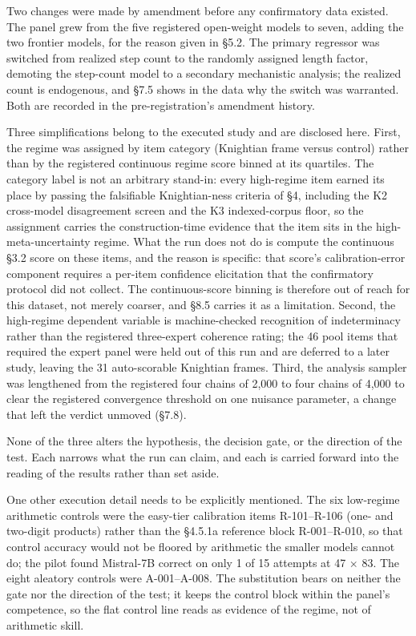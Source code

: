 \documentclass{article}
\begin{document}
Two changes were made by amendment before any confirmatory data existed.
The panel grew from the five registered open-weight models to seven,
adding the two frontier models, for the reason given in \S{}5.2. The
primary regressor was switched from realized step count to the randomly
assigned length factor, demoting the step-count model to a secondary
mechanistic analysis; the realized count is endogenous, and \S{}7.5 shows
in the data why the switch was warranted. Both are recorded in the
pre-registration's amendment history.

Three simplifications belong to the executed study and are disclosed
here. First, the regime was assigned by item category (Knightian frame
versus control) rather than by the registered continuous regime score
binned at its quartiles. The category label is not an arbitrary
stand-in: every high-regime item earned its place by passing the
falsifiable Knightian-ness criteria of \S{}4, including the K2 cross-model
disagreement screen and the K3 indexed-corpus floor, so the assignment
carries the construction-time evidence that the item sits in the
high-meta-uncertainty regime. What the run does not do is compute the
continuous \S{}3.2 score on these items, and the reason is specific: that
score's calibration-error component requires a per-item confidence
elicitation that the confirmatory protocol did not collect. The
continuous-score binning is therefore out of reach for this dataset, not
merely coarser, and \S{}8.5 carries it as a limitation. Second, the
high-regime dependent variable is machine-checked recognition of
indeterminacy rather than the registered three-expert coherence rating;
the 46 pool items that required the expert panel were held out of this
run and are deferred to a later study, leaving the 31 auto-scorable
Knightian frames. Third, the analysis sampler was lengthened from the
registered four chains of 2,000 to four chains of 4,000 to clear the
registered convergence threshold on one nuisance parameter, a change
that left the verdict unmoved (\S{}7.8).

None of the three alters the hypothesis, the decision gate, or the
direction of the test. Each narrows what the run can claim, and each is
carried forward into the reading of the results rather than set aside.

One other execution detail needs to be explicitly mentioned. The six
low-regime arithmetic controls were the easy-tier calibration items
R-101--R-106 (one- and two-digit products) rather than the \S{}4.5.1a
reference block R-001--R-010, so that control accuracy would not be
floored by arithmetic the smaller models cannot do; the pilot found
Mistral-7B correct on only 1 of 15 attempts at 47 \ensuremath{\times} 83. The eight
aleatory controls were A-001--A-008. The substitution bears on neither
the gate nor the direction of the test; it keeps the control block
within the panel's competence, so the flat control line reads as
evidence of the regime, not of arithmetic skill.
\end{document}
